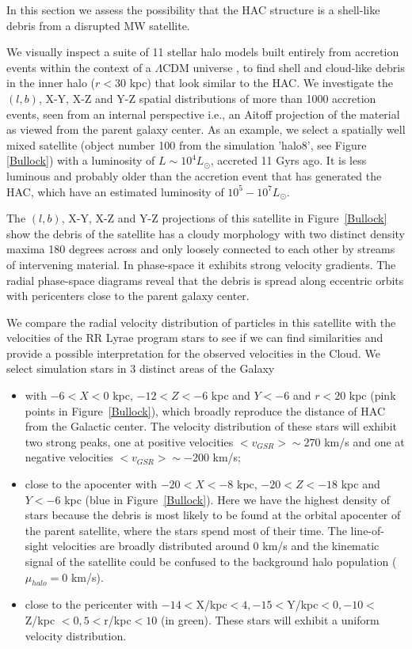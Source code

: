 \documentclass[useAMS,usenatbib]{mn2e}
\begin{document}
In this section we assess the possibility that the HAC structure is a shell-like debris from a disrupted MW satellite.

We visually inspect a suite of 11 stellar halo models built entirely from accretion events within the context of a $\Lambda$CDM universe \citep{Jo08}, to find shell and cloud-like debris in the inner halo ($r < 30$ kpc) that look similar to the HAC. We investigate the $(l,b)$, X-Y, X-Z and Y-Z spatial distributions of more than 1000 accretion events, seen from an internal perspective i.e., an Aitoff projection of the material as viewed from the parent galaxy center. As an example, we select a spatially well mixed satellite (object number 100 from the simulation 'halo8', see Figure \ref{Bullock}) with a luminosity of $L \sim 10^{4} L_{\odot}$, accreted 11 Gyrs ago. It is less luminous and probably older than the accretion event that has generated the HAC, which have an estimated luminosity of  $10^{5}-10^{7} L_{\odot}$.

The $(l,b)$, X-Y, X-Z and Y-Z projections of this satellite in Figure~\ref{Bullock} show the debris of the satellite has a cloudy morphology with two distinct density maxima 180 degrees across and only loosely connected to each other by streams of intervening material. In phase-space it exhibits strong velocity gradients. The radial phase-space diagrams reveal that the debris is spread along eccentric orbits with pericenters close to the parent galaxy center. 

We compare the radial velocity distribution of particles in this satellite with the velocities of the RR Lyrae program stars to see if we can find similarities and provide a possible interpretation for the observed velocities in the Cloud. We select simulation stars in 3 distinct areas of the Galaxy
\begin {itemize}
\item with $-6<X< 0$ kpc, $-12<Z<-6$ kpc and $Y<-6$ and $r < 20 $ kpc (pink points in Figure~\ref{Bullock}), which broadly reproduce the distance of HAC from the Galactic center. The velocity distribution of these stars will exhibit two strong peaks, one at positive velocities $<v_{GSR}> \sim 270$ km/s and one at negative velocities $<v_{GSR}> \sim -200$ km/s;
\item  close to the apocenter with $-20<X<-8$ kpc, $-20<Z<-18$ kpc and $Y< -6$ kpc (blue in Figure~\ref{Bullock}). Here we have the highest density of stars because the debris is most likely to be found at the orbital apocenter of the parent satellite, where the stars spend most of their time.  The line-of-sight velocities are broadly distributed around 0 km/s and the kinematic signal of the satellite could be confused to the background halo population ($\mu_{halo} = 0$ km/s).
 \item close to the pericenter  with $-14<$X/kpc$< 4, -15<$Y/kpc$ < 0 , -10<$Z/kpc $< 0, 5<$r/kpc$< 10$ (in green). These stars will exhibit a uniform velocity distribution. 
 \end{itemize}
\end{document}
